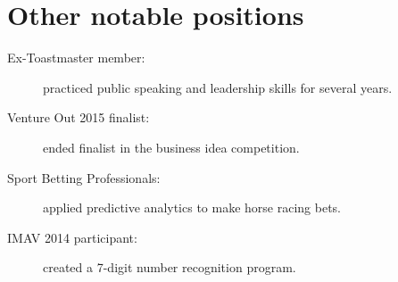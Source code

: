 \documentclass[10pt]{CurriculumVitae}
\begin{document}
  \section{Other notable positions}
    \begin{description}
      \item[Ex-Toastmaster member:] practiced public speaking and leadership skills for several years.
      \item[Venture Out 2015 finalist:] ended finalist in the business idea competition.
      \item[Sport Betting Professionals:] applied predictive analytics to make horse racing bets.
      \item[IMAV 2014 participant:] created a 7-digit number recognition program.
    \end{description}
\end{document}
